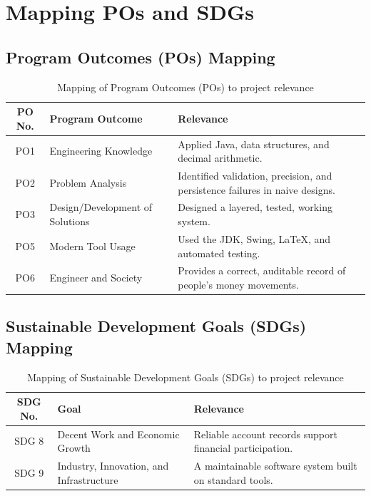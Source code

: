 \documentclass[11pt,a4paper]{report}
\begin{document}
\section{Mapping POs and SDGs}
\subsection{Program Outcomes (POs) Mapping}
\begin{table}[h]
    \centering
    \caption{Mapping of Program Outcomes (POs) to project relevance}
    \begin{tabular}{|c|p{6cm}|p{6cm}|}
        \hline
        \textbf{PO No.} & \textbf{Program Outcome} & \textbf{Relevance} \\
        \hline
        PO1 & Engineering Knowledge & Applied Java, data structures, and decimal arithmetic. \\
        \hline
        PO2 & Problem Analysis & Identified validation, precision, and persistence failures in naive designs. \\
        \hline
        PO3 & Design/Development of Solutions & Designed a layered, tested, working system. \\
        \hline
        PO5 & Modern Tool Usage & Used the JDK, Swing, \LaTeX, and automated testing. \\
        \hline
        PO6 & Engineer and Society & Provides a correct, auditable record of people's money movements. \\
        \hline
    \end{tabular}
\end{table}

\subsection{Sustainable Development Goals (SDGs) Mapping}
\begin{table}[h]
    \centering
    \caption{Mapping of Sustainable Development Goals (SDGs) to project relevance}
    \begin{tabular}{|c|p{6cm}|p{6cm}|}
        \hline
        \textbf{SDG No.} & \textbf{Goal} & \textbf{Relevance} \\
        \hline
        SDG 8 & Decent Work and Economic Growth & Reliable account records support financial participation. \\
        \hline
        SDG 9 & Industry, Innovation, and Infrastructure & A maintainable software system built on standard tools. \\
        \hline
    \end{tabular}
\end{table}
\end{document}
